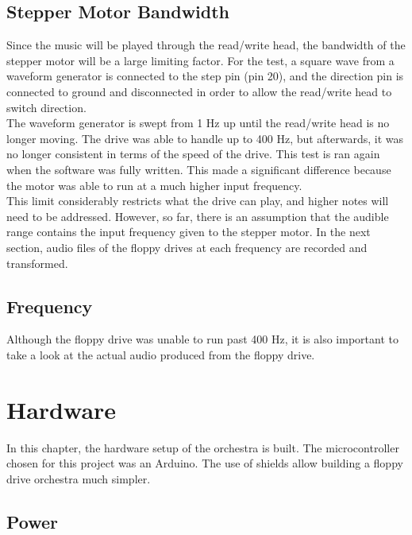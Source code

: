 \documentclass[11pt, a4paper]{report}
\begin{document}
\section{Stepper Motor Bandwidth}

Since the music will be played through the read/write head, the bandwidth of the stepper motor will be a large limiting factor. For the test, a square wave from a waveform generator is connected to the step pin (pin 20), and the direction pin is connected to ground and disconnected in order to allow the read/write head to switch direction. \\

The waveform generator is swept from 1 Hz up until the read/write head is no longer moving. The drive was able to handle up to 400 Hz, but afterwards, it was no longer consistent in terms of the speed of the drive. This test is ran again when the software was fully written. This made a significant difference because the motor was able to run at a much higher input frequency. \\

This limit considerably restricts what the drive can play, and higher notes will need to be addressed. However, so far, there is an assumption that the audible range contains the input frequency given to the stepper motor. In the next section, audio files of the floppy drives at each frequency are recorded and transformed. \\

\section{Frequency}

Although the floppy drive was unable to run past 400 Hz, it is also important to take a look at the actual audio produced from the floppy drive. 


\chapter{Hardware}

In this chapter, the hardware setup of the orchestra is built. The microcontroller chosen for this project was an Arduino. The use of shields allow building a floppy drive orchestra much simpler. 

\section{Power}
\end{document}
